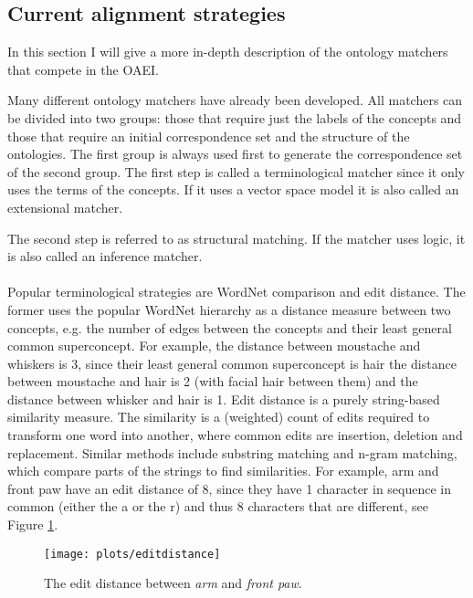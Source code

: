 \documentclass{article}
\begin{document}
 \subsection{Current alignment strategies} \label{strategies}
 In this section I will give a more in-depth description of the ontology matchers that compete in the OAEI.
 
 Many different ontology matchers have already been developed. All matchers can be divided into two groups: those that require just the labels of the concepts and those that require an initial correspondence set and the structure of the ontologies. The first group is always used first to generate the correspondence set of the second group. The first step is called a terminological matcher since it only uses the terms of the concepts. If it uses a vector space model it is also called an extensional matcher.
 
 The second step is referred to as structural matching. If the matcher uses logic, it is also called an inference matcher\cite{future}.
 \paragraph{}
 Popular terminological strategies are WordNet comparison and edit distance. The former uses the popular WordNet hierarchy as a distance measure between two concepts, e.g. the number of edges between the concepts and their least general common superconcept\cite{lin2008}.
 For example, the distance between moustache and whiskers is 3, since their least general common superconcept is hair the distance between moustache and hair is 2 (with facial hair between them) and the distance between whisker and hair is 1.
 Edit distance is a purely string-based similarity measure. The similarity is a (weighted) count of edits required to transform one word into another, where common edits are insertion, deletion and replacement. Similar methods include substring matching and n-gram matching, which compare parts of the strings to find similarities\cite{singh2014, levenshtein}.
 For example, arm and front paw have an edit distance of 8, since they have 1 character in sequence in common (either the a or the r) and thus 8 characters that are different, see Figure \ref{levenshteinfig}.
 
 \begin{figure}[H]
 \centering
 \texttt{[image: plots/editdistance]}
 \caption[Edit distance example]{The edit distance between \textit{arm} and \textit{front paw}.}
 \label{levenshteinfig}
 \end{figure}
 
\end{document}
